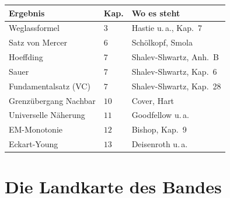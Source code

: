 \begin{merksatz}
\begin{center}
{\small
\renewcommand{\arraystretch}{1.5}
\begin{tabular}{@{}P{3.6cm}P{1.2cm}P{3.2cm}@{}}
\toprule
\textbf{Ergebnis} & \textbf{Kap.} & \textbf{Wo es steht}\\
\midrule
Weglassformel & $3$ & Hastie u.\,a., Kap.\ 7\\
Satz von Mercer & $6$ & Schölkopf, Smola\\
Hoeffding & $7$ & Shalev-Shwartz, Anh.\ B\\
Sauer & $7$ & Shalev-Shwartz, Kap.\ 6\\
Fundamentalsatz (VC) & $7$ & Shalev-Shwartz, Kap.\ 28\\
Grenzübergang Nachbar & $10$ & Cover, Hart\\
Universelle Näherung & $11$ & Goodfellow u.\,a.\\
EM-Monotonie & $12$ & Bishop, Kap.\ 9\\
Eckart-Young & $13$ & Deisenroth u.\,a.\\
\bottomrule
\end{tabular}}
\end{center}

\begin{center}
\begin{minipage}{0.88\textwidth}
\end{minipage}
\end{center}
\end{merksatz}

\section{Die Landkarte des Bandes}


